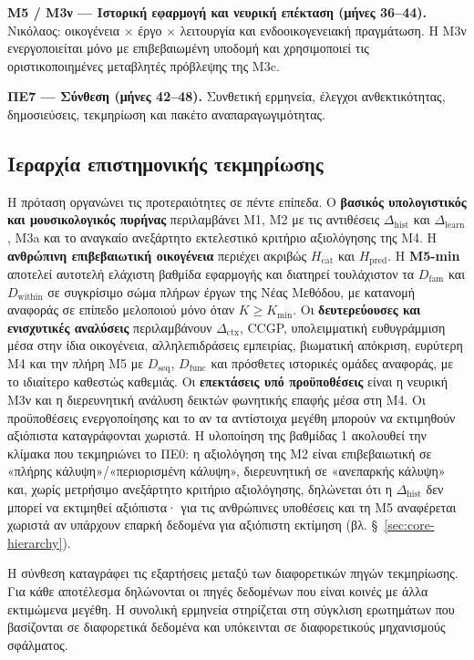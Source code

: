 \documentclass[11pt,a4paper]{article}
\begin{document}
\textbf{M5 / M3ν --- Ιστορική εφαρμογή και νευρική επέκταση (μήνες 36--44).} Νικόλαος: οικογένεια $\times$ έργο $\times$ λειτουργία και ενδοοικογενειακή πραγμάτωση. Η M3ν ενεργοποιείται μόνο με επιβεβαιωμένη υποδομή και χρησιμοποιεί τις οριστικοποιημένες μεταβλητές πρόβλεψης της M3c.

\textbf{ΠΕ7 --- Σύνθεση (μήνες 42--48).} Συνθετική ερμηνεία, έλεγχοι ανθεκτικότητας, δημοσιεύσεις, τεκμηρίωση και πακέτο αναπαραγωγιμότητας.

\subsection{Ιεραρχία επιστημονικής τεκμηρίωσης}\label{app:impl-evidence}

Η πρόταση οργανώνει τις προτεραιότητες σε πέντε επίπεδα. Ο \textbf{βασικός υπολογιστικός και μουσικολογικός πυρήνας} περιλαμβάνει M1, M2 με τις αντιθέσεις $\Delta_{\mathrm{hist}}$ και $\Delta_{\mathrm{learn}}$, M3a και το αναγκαίο ανεξάρτητο εκτελεστικό κριτήριο αξιολόγησης της M4. Η \textbf{ανθρώπινη επιβεβαιωτική οικογένεια} περιέχει ακριβώς $H_{\mathrm{cat}}$ και $H_{\mathrm{pred}}$. Η \textbf{M5-min} αποτελεί αυτοτελή ελάχιστη βαθμίδα εφαρμογής και διατηρεί τουλάχιστον τα $D_{\mathrm{fam}}$ και $D_{\mathrm{within}}$ σε συγκρίσιμο σώμα πλήρων έργων της Νέας Μεθόδου, με κατανομή αναφοράς σε επίπεδο μελοποιού μόνο όταν $K\ge K_{\min}$. Οι \textbf{δευτερεύουσες και ενισχυτικές αναλύσεις} περιλαμβάνουν $\Delta_{\mathrm{ctx}}$, CCGP, υπολειμματική ευθυγράμμιση μέσα στην ίδια οικογένεια, αλληλεπιδράσεις εμπειρίας, βιωματική απόκριση, ευρύτερη M4 και την πλήρη M5 με $D_{\mathrm{seq}}$, $D_{\mathrm{func}}$ και πρόσθετες ιστορικές ομάδες αναφοράς, με το ιδιαίτερο καθεστώς καθεμιάς. Οι \textbf{επεκτάσεις υπό προϋποθέσεις} είναι η νευρική M3ν και η διερευνητική ανάλυση δεικτών φωνητικής επαφής μέσα στη M4. Οι προϋποθέσεις ενεργοποίησης και το αν τα αντίστοιχα μεγέθη μπορούν να εκτιμηθούν αξιόπιστα καταγράφονται χωριστά. Η υλοποίηση της βαθμίδας 1 ακολουθεί την κλίμακα που τεκμηριώνει το ΠΕ0: η αξιολόγηση της M2 είναι επιβεβαιωτική σε «πλήρης κάλυψη»/«περιορισμένη κάλυψη», διερευνητική σε «ανεπαρκής κάλυψη» και, χωρίς μετρήσιμο ανεξάρτητο κριτήριο αξιολόγησης, δηλώνεται ότι η $\Delta_{\mathrm{hist}}$ δεν μπορεί να εκτιμηθεί αξιόπιστα· για τις ανθρώπινες υποθέσεις και τη M5 αναφέρεται χωριστά αν υπάρχουν επαρκή δεδομένα για αξιόπιστη εκτίμηση (βλ. §~\ref{sec:core-hierarchy}).

Η σύνθεση καταγράφει τις εξαρτήσεις μεταξύ των διαφορετικών πηγών τεκμηρίωσης. Για κάθε αποτέλεσμα δηλώνονται οι πηγές δεδομένων που είναι κοινές με άλλα εκτιμώμενα μεγέθη. Η συνολική ερμηνεία στηρίζεται στη σύγκλιση ερωτημάτων που βασίζονται σε διαφορετικά δεδομένα και υπόκεινται σε διαφορετικούς μηχανισμούς σφάλματος.
\end{document}
